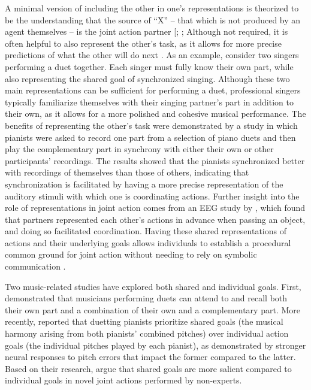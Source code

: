 \documentclass[10pt,a4paper,onecolumn]{article}
\begin{document}
A minimal version of including the other in one's representations is theorized to be the understanding that the source of ``X'' -- that which is not produced by an agent themselves -- is the joint action partner {[}\textcite{loehrSoundYouMe2016}; \textcite{vesperMinimalArchitectureJoint2010}; Although not required, it is often helpful to also represent the other's task, as it allows for more precise predictions of what the other will do next \autocite{boltSensoryAttenuationAuditory2021,wenkeWhatSharedJoint2011}. As an example, consider two singers performing a duet together. Each singer must fully know their own part, while also representing the shared goal of synchronized singing. Although these two main representations can be sufficient for performing a duet, professional singers typically familiarize themselves with their singing partner's part in addition to their own, as it allows for a more polished and cohesive musical performance. The benefits of representing the other's task were demonstrated by a study \autocite{kellerPianistsDuetBetter2007} in which pianists were asked to record one part from a selection of piano duets and then play the complementary part in synchrony with either their own or other participants' recordings. The results showed that the pianists synchronized better with recordings of themselves than those of others, indicating that synchronization is facilitated by having a more precise representation of the auditory stimuli with which one is coordinating actions. Further insight into the role of representations in joint action comes from an EEG study by \textcite{kourtisPredictiveRepresentationOther2012}, which found that partners represented each other's actions in advance when passing an object, and doing so facilitated coordination. Having these shared representations of actions and their underlying goals allows individuals to establish a procedural common ground for joint action without needing to rely on symbolic communication \autocite{sebanzJointActionBodies2006}.

Two music-related studies have explored both shared and individual goals. First, \textcite{kellerMusicalMeterAttention2005} demonstrated that musicians performing duets can attend to and recall both their own part and a combination of their own and a complementary part. More recently, \textcite{loehrMonitoringIndividualJoint2013} reported that duetting pianists prioritize shared goals (the musical harmony arising from both pianists' combined pitches) over individual action goals (the individual pitches played by each pianist), as demonstrated by stronger neural responses to pitch errors that impact the former compared to the latter. Based on their research, \textcite{loehrSoundYouMe2016} argue that shared goals are more salient compared to individual goals in novel joint actions performed by non-experts.
\end{document}
